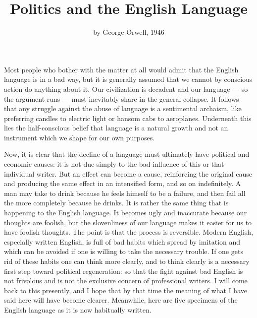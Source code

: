 \documentclass[12pt]{article}
\title{\vspace{-2.5cm}Politics and the English Language\vspace{-8mm}}
\author{by George Orwell, 1946}
\date{\vspace{-2em}}
\begin{document}
\maketitle

Most people who bother with the matter at all would admit that the English language is in a bad way, but it is generally assumed that we cannot by conscious action do anything about it. Our civilization is decadent and our language — so the argument runs — must inevitably share in the general collapse. It follows that any struggle against the abuse of language is a sentimental archaism, like preferring candles to electric light or hansom cabs to aeroplanes. Underneath this lies the half-conscious belief that language is a natural growth and not an instrument which we shape for our own purposes.

Now, it is clear that the decline of a language must ultimately have political and economic causes: it is not due simply to the bad influence of this or that individual writer. But an effect can become a cause, reinforcing the original cause and producing the same effect in an intensified form, and so on indefinitely. A man may take to drink because he feels himself to be a failure, and then fail all the more completely because he drinks. It is rather the same thing that is happening to the English language. It becomes ugly and inaccurate because our thoughts are foolish, but the slovenliness of our language makes it easier for us to have foolish thoughts. The point is that the process is reversible. Modern English, especially written English, is full of bad habits which spread by imitation and which can be avoided if one is willing to take the necessary trouble. If one gets rid of these habits one can think more clearly, and to think clearly is a necessary first step toward political regeneration: so that the fight against bad English is not frivolous and is not the exclusive concern of professional writers. I will come back to this presently, and I hope that by that time the meaning of what I have said here will have become clearer. Meanwhile, here are five specimens of the English language as it is now habitually written.
\end{document}
